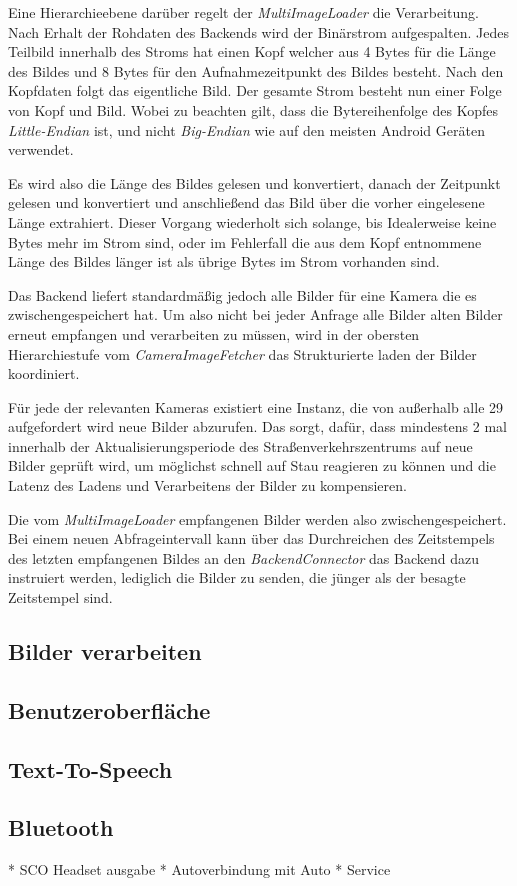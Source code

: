 Eine Hierarchieebene darüber regelt der {\em MultiImageLoader} die Verarbeitung.
Nach Erhalt der Rohdaten des Backends wird der Binärstrom aufgespalten.
Jedes Teilbild innerhalb des Stroms hat einen Kopf welcher aus 4 Bytes für die Länge des Bildes und 8 Bytes für den Aufnahmezeitpunkt des Bildes besteht.
Nach den Kopfdaten folgt das eigentliche Bild. Der gesamte Strom besteht nun einer Folge von Kopf und Bild. Wobei zu beachten gilt, dass die Bytereihenfolge des Kopfes {\em Little-Endian} ist, und nicht {\em Big-Endian} wie auf den meisten Android Geräten verwendet.

Es wird also die Länge des Bildes gelesen und konvertiert, danach der Zeitpunkt gelesen und konvertiert und anschließend das Bild über die vorher eingelesene Länge extrahiert. Dieser Vorgang wiederholt sich solange, bis Idealerweise keine Bytes mehr im Strom sind, oder im Fehlerfall die aus dem Kopf entnommene Länge des Bildes länger ist als übrige Bytes im Strom vorhanden sind.

Das Backend liefert standardmäßig jedoch alle Bilder für eine Kamera die es zwischengespeichert hat. Um also nicht bei jeder Anfrage alle Bilder alten Bilder erneut empfangen und verarbeiten zu müssen, wird in der obersten Hierarchiestufe vom {\em CameraImageFetcher} das Strukturierte laden der Bilder koordiniert.

Für jede der relevanten Kameras existiert eine Instanz, die von außerhalb alle 29 aufgefordert wird neue Bilder abzurufen. Das sorgt, dafür, dass mindestens 2 mal innerhalb der Aktualisierungsperiode des Straßenverkehrszentrums auf neue Bilder geprüft wird, um möglichst schnell auf Stau reagieren zu können und die Latenz des Ladens und Verarbeitens der Bilder zu kompensieren.

Die vom {\em MultiImageLoader} empfangenen Bilder werden also zwischengespeichert. Bei einem neuen Abfrageintervall kann über das Durchreichen des Zeitstempels des letzten empfangenen Bildes an den {\em BackendConnector} das Backend dazu instruiert werden, lediglich die Bilder zu senden, die jünger als der besagte Zeitstempel sind.

\subsection{Bilder verarbeiten}
\subsection{Benutzeroberfläche}
\subsection{Text-To-Speech}
\subsection{Bluetooth}
* SCO Headset ausgabe
* Autoverbindung mit Auto
* Service 